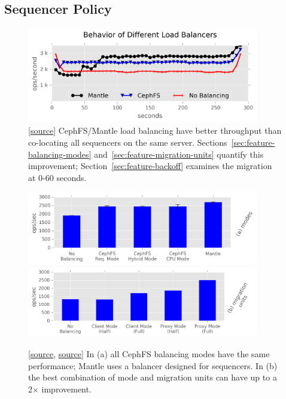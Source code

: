 \subsection{Sequencer Policy}
\label{sec:evaluation} 

\begin{figure}[t!]
\centering
\includegraphics[width=0.9\textwidth]{./chapters/controlplane/malacology/figures/mantle-balancer-behaviors.png}
\caption{
[\href{https://github.com/michaelsevilla/malacology-popper/blob/v2.1/experiments/mds-zlog-seq-migrate-redux-3client/results-mantle-runs/visualize.ipynb}{source}]
CephFS/Mantle load balancing have better throughput than co-locating all
sequencers on the same server.  Sections~\ref{sec:feature-balancing-modes}
and~\ref{sec:feature-migration-units} quantify this improvement;
Section~\ref{sec:feature-backoff} examines the migration at 0-60 seconds.
}\label{fig:mantle-balancer-behaviors}
\end{figure}

\begin{figure}[t!]
\centering
\includegraphics[width=0.9\textwidth]{./chapters/controlplane/malacology/figures/mantle-balancer-performance.png}
\includegraphics[width=0.9\textwidth]{./chapters/controlplane/malacology/figures/mantle-mode-performance.png}
\caption{
[\href{https://github.com/michaelsevilla/malacology-popper/blob/v2.1/experiments/mds-zlog-seq-migrate-redux-3client/results-mantle-runs/visualize.ipynb}{source},
\href{https://github.com/michaelsevilla/malacology-popper/blob/v2.1/experiments/mds-zlog-seq-migrate-redux-waves/results-paper/visualize.ipynb}{source}]
In (a) all CephFS balancing modes have the same performance; Mantle uses a
balancer designed for sequencers. In (b) the best combination of mode and
migration units can have up to a 2\(\times\)
improvement.}\label{fig:mantle-balancer-performance}
\end{figure}

